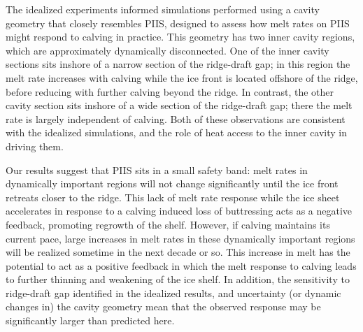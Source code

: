 \documentclass[draft]{agujournal2019}
\begin{document}
The idealized experiments informed simulations performed using a cavity geometry that closely resembles PIIS, designed to assess how melt rates on PIIS might respond to calving in practice. This geometry has two inner cavity regions, which are approximately dynamically disconnected. One of the inner cavity sections sits inshore of a narrow section of the ridge-draft gap; in this region the melt rate increases with calving while the ice front is located offshore of the ridge, before reducing with further calving beyond the ridge. In contrast, the other cavity section sits inshore of a wide section of the ridge-draft gap; there the melt rate is largely independent of calving. Both of these observations are consistent with the idealized simulations, and the role of heat access to the inner cavity in driving them. %

Our results suggest that PIIS sits in a small safety band: melt rates in dynamically important regions will not change significantly until the ice front retreats closer to the ridge. This lack of melt rate response while the ice sheet accelerates in response to a calving induced loss of buttressing acts as a negative feedback, promoting regrowth of the shelf. However, if calving maintains its current pace, large increases in melt rates in these dynamically important regions will be realized sometime in the next decade or so. This increase in melt has the potential to act as a positive feedback in which the melt response to calving leads to further thinning and weakening of the ice shelf. In addition, the sensitivity to ridge-draft gap identified in the idealized results, and uncertainty (or dynamic changes in) the cavity geometry mean that the observed response may be significantly larger than predicted here. 

\end{document}
